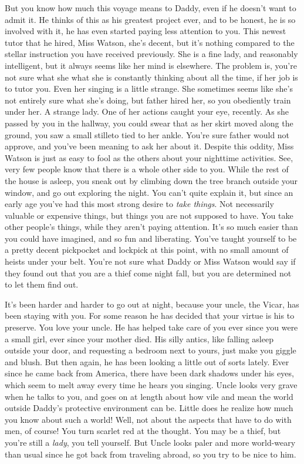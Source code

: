 \documentclass[char]{airship}
\begin{document}
But you know how much this voyage means to Daddy, even if he doesn't
want to admit it. He thinks of this as his greatest project ever, and
to be honest, he is so involved with it, he has even started paying
less attention to you. This newest tutor that he hired, Miss Watson,
she's decent, but it's nothing compared to the stellar instruction you
have received previously. She is a fine lady, and reasonably
intelligent, but it always seems like her mind is elsewhere. The
problem is, you're not sure what she what she is constantly thinking
about all the time, if her job is to tutor you. Even her singing is a
little strange. She sometimes seems like she's not entirely sure what
she's doing, but father hired her, so you obediently train under
her. A strange lady.  One of her actions caught your eye, recently. As
she passed by you in the hallway, you could swear that as her skirt
moved along the ground, you saw a small stilleto tied to her ankle.
You're sure father would not approve, and you've been meaning to ask
her about it.  Despite this oddity, Miss Watson is just as easy to
fool as the others about your nighttime activities. See, very few
people know that there is a whole other side to you. While the rest of
the house is asleep, you sneak out by climbing down the tree branch
outside your window, and go out exploring the night. You can't quite
explain it, but since an early age you've had this most strong desire
to {\it take things}. Not necessarily valuable or expensive things,
but things you are not supposed to have. You take other people's
things, while they aren't paying attention. It's so much easier than
you could have imagined, and so fun and liberating. You've taught
yourself to be a pretty decent pickpocket and lockpick at this point,
with no small amount of heists under your belt. You're not sure what
Daddy or Miss Watson would say if they found out that you are a thief
come night fall, but you are determined not to let them find out.

It's been harder and harder to go out at night, because your uncle,
the Vicar, has been staying with you. For some reason he has decided
that your virtue is his to preserve. You love your uncle. He has
helped take care of you ever since you were a small girl, ever since
your mother died. His silly antics, like falling asleep outside your
door, and requesting a bedroom next to yours, just make you giggle and
blush. But then again, he has been looking a little out of sorts
lately. Ever since he came back from America, there have been dark
shadows under his eyes, which seem to melt away every time he hears
you singing. Uncle looks very grave when he talks to you, and goes on
at length about how vile and mean the world outside Daddy's protective
environment can be. Little does he realize how much you know about
such a world! Well, not about the aspects that have to do with men, of
course! You turn scarlet red at the thought. You may be a thief, but
you're still a {\it lady}, you tell yourself. But Uncle looks paler
and more world-weary than usual since he got back from traveling
abroad, so you try to be nice to him.
\end{document}
